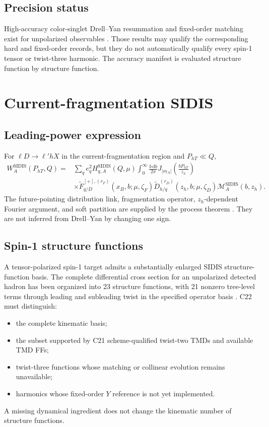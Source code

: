 \documentclass[11pt]{article}
\newcommand{\dd}{\mathrm{d}}
\newcommand{\SIDIS}{\mathrm{SIDIS}}
\newcommand{\cM}{\mathcal M}
\begin{document}
\subsection{Precision status}

High-accuracy color-singlet Drell--Yan resummation and fixed-order matching exist for unpolarized observables \cite{NeumannCampbell2022,CamardaCieriFerrera2023}.  Those results may qualify the corresponding hard and fixed-order records, but they do not automatically qualify every spin-1 tensor or twist-three harmonic.  The accuracy manifest is evaluated structure function by structure function.

\section{Current-fragmentation SIDIS}
\label{sec:sidis}

\subsection{Leading-power expression}

For \(\ell D\to\ell' hX\) in the current-fragmentation region and \(P_{hT}\ll Q\),
\begin{align}
 W_A^{\SIDIS}(P_{hT},Q)={}&
 \sum_q e_q^2
 H_{q,A}^{\SIDIS}(Q,\mu)
 \int_0^\infty\frac{b\,\dd b}{2\pi}
 J_{|m_A|}\!\left(\frac{bP_{hT}}{z_h}\right)
 \nonumber\\
 &\times
 \widetilde F_{q/D}^{[+],(r_F)}(x_B,b;\mu,\zeta_F)
 \widetilde D_{h/q}^{(r_D)}(z_h,b;\mu,\zeta_D)
 \cM_A^{\SIDIS}(b,z_h).
 \label{eq:sidis-w}
\end{align}
The future-pointing distribution link, fragmentation operator, \(z_h\)-dependent Fourier argument, and soft partition are supplied by the process theorem \cite{JiMaYuan2004,CollinsMetz2004}.  They are not inferred from Drell--Yan by changing one sign.

\subsection{Spin-1 structure functions}

A tensor-polarized spin-1 target admits a substantially enlarged SIDIS structure-function basis.  The complete differential cross section for an unpolarized detected hadron has been organized into 23 structure functions, with 21 nonzero tree-level terms through leading and subleading twist in the specified operator basis \cite{ZhaoEtAl2025}.  C22 must distinguish:
\begin{itemize}
\item the complete kinematic basis;
\item the subset supported by C21 scheme-qualified twist-two TMDs and available TMD FFs;
\item twist-three functions whose matching or collinear evolution remains unavailable;
\item harmonics whose fixed-order \(Y\) reference is not yet implemented.
\end{itemize}
A missing dynamical ingredient does not change the kinematic number of structure functions.
\end{document}
